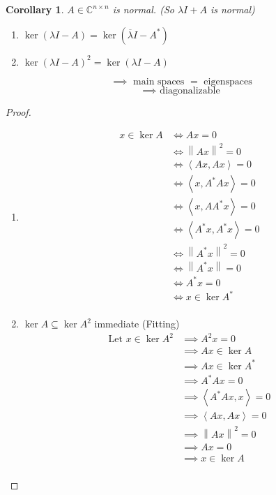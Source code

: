 \documentclass{article}
\newtheorem{corollary}{Corollary}  \numberwithin{corollary}{section}
\newcommand{\angel}[1]{\left\langle#1\right\rangle}
\newcommand{\norm}[1]{\left\|#1\right\|}
\begin{document}
\begin{corollary} %
  \label{cor125}
  $A \in \mathbb C^{n \times n}$ is normal. (So $\lambda I + A$ is normal)
  \begin{enumerate}
    \item $\ker(\lambda I - A) = \ker(\overline{\lambda} I - A^*)$
    \item $\ker(\lambda I - A)^2 = \ker(\lambda I - A)$
  \end{enumerate}
  \[ \implies \text{ main spaces } = \text{ eigenspaces} \]
  \[ \implies \text{ diagonalizable} \]
\end{corollary}

\begin{proof}
  \begin{enumerate}
    \item
      \begin{align*}
        x \in \ker{A} &\iff Ax = 0 \\
          &\iff \norm{Ax}^2 = 0 \\
          &\iff \angel{Ax, Ax} = 0 \\
          &\iff \angel{x, A^* Ax} = 0 \\
          &\iff \angel{x, AA^* x} = 0 \\
          &\iff \angel{A^* x, A^* x} = 0 \\
          &\iff \norm{A^* x}^2 = 0 \\
          &\iff \norm{A^* x} = 0 \\
          &\iff A^* x = 0 \\
          &\iff x \in \ker{A^*} \\
      \end{align*}
    \item $\ker{A} \subseteq \ker{A^2}$ immediate (Fitting)
      \begin{align*}
        \text{Let } x \in \ker{A^2}
          &\implies A^2 x = 0 \\
          &\implies Ax \in \ker{A} \\
          &\implies Ax \in \ker{A^*} \\
          &\implies A^* Ax = 0 \\
          &\implies \angel{A^* Ax, x} = 0 \\
          &\implies \angel{Ax, Ax} = 0 \\
          &\implies \norm{Ax}^2 = 0 \\
          &\implies Ax = 0 \\
          &\implies x \in \ker{A} \\
      \end{align*}
  \end{enumerate}
\end{proof}
\end{document}
